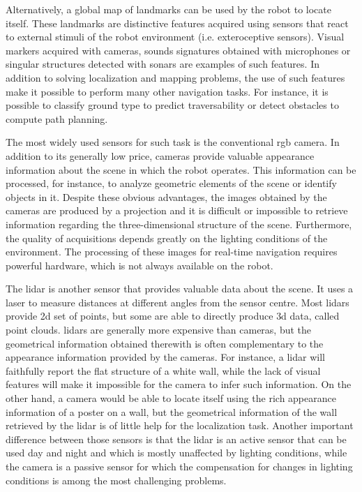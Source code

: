 Alternatively, a global map of landmarks can be used by the robot to locate itself. These landmarks are distinctive features acquired using sensors that react to external stimuli of the robot environment (i.e. exteroceptive sensors). Visual markers acquired with cameras, sounds signatures obtained with microphones or singular structures detected with sonars are examples of such features. In addition to solving localization and mapping problems, the use of such features make it possible to perform many other navigation tasks. For instance, it is possible to classify ground type to predict traversability or detect obstacles to compute path planning.

The most widely used sensors for such task is the conventional \gls*{rgb} camera. In addition to its generally low price, cameras provide valuable appearance information about the scene in which the robot operates. This information can be processed, for instance, to analyze geometric elements of the scene or identify objects in it. Despite these obvious advantages, the images obtained by the cameras are produced by a projection and it is difficult or impossible to retrieve information regarding the three-dimensional structure of the scene. Furthermore, the quality of acquisitions depends greatly on the lighting conditions of the environment. The processing of these images for real-time navigation requires powerful hardware, which is not always available on the robot.

The \gls*{lidar} is another sensor that provides valuable data about the scene. It uses a laser to measure distances at different angles from the sensor centre. Most \gls*{lidar}s provide \gls*{2d} set of points, but some are able to directly produce \gls*{3d} data, called point clouds. \gls*{lidar}s are generally more expensive than cameras, but the geometrical information obtained therewith is often complementary to the appearance information provided by the cameras. For instance, a \gls*{lidar} will faithfully report the flat structure of a white wall, while the lack of visual features will make it impossible for the camera to infer such information. On the other hand, a camera would be able to locate itself using the rich appearance information of a poster on a wall, but the geometrical information of the wall retrieved by the \gls*{lidar} is of little help for the localization task. Another important difference between those sensors is that the \gls*{lidar} is an active sensor that can be used day and night and which is mostly unaffected by lighting conditions, while the camera is a passive sensor for which the compensation for changes in lighting conditions is among the most challenging problems. 

